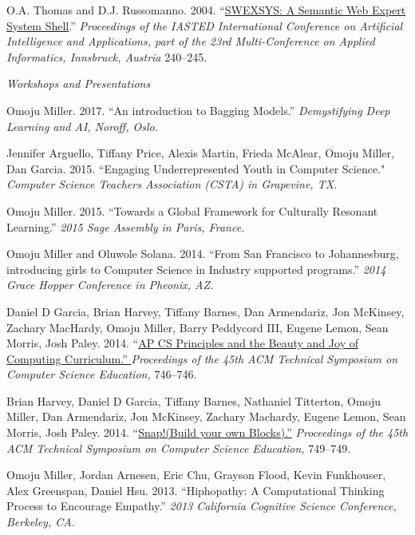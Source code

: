 \documentclass[11pt,article,oneside]{memoir}
\begin{document}
\ind O.A. Thomas and D.J. Russomanno. 2004. ``\href{http://scholar.google.com/citations?view_op=view_citation&hl=en&user=E7z_wrwAAAAJ&citation_for_view=E7z_wrwAAAAJ:2osOgNQ5qMEC}{SWEXSYS: A Semantic Web Expert System Shell}.'' \emph{Proceedings of the IASTED International Conference on Artificial Intelligence and Applications, part of the 23rd Multi-Conference on Applied Informatics, Innsbruck, Austria} 240--245.

\bigskip

\noindent\emph{Workshops and Presentations  \vspace{0.05in}}


\ind Omoju Miller. 2017. ``An introduction to Bagging Models.'' \emph{Demystifying Deep Learning and AI, Noroff, Oslo.}

\ind Jennifer Arguello, Tiffany Price, Alexis Martin, Frieda McAlear, Omoju Miller, Dan Garcia. 2015. ``Engaging Underrepresented Youth in Computer Science."  \emph{Computer Science Teachers Association (CSTA) in Grapevine, TX.}

\ind Omoju Miller. 2015. ``Towards a Global Framework for Culturally Resonant Learning.'' \emph{2015 Sage Assembly in Paris, France.}

\ind Omoju Miller and Oluwole Solana. 2014. ``From San Francisco to Johannesburg, introducing girls to Computer Science in Industry supported programs.'' \emph{2014 Grace Hopper Conference in Pheonix, AZ.}

\ind Daniel D Garcia, Brian Harvey, Tiffany Barnes, Dan Armendariz, Jon McKinsey, Zachary MacHardy, Omoju Miller, Barry Peddycord III, Eugene Lemon, Sean Morris, Josh Paley. 2014. ``\href{http://dl.acm.org/citation.cfm?id=2539026}{AP CS Principles and the Beauty and Joy of Computing Curriculum.'' }\emph{Proceedings of the 45th ACM Technical Symposium on Computer Science Education,} 746--746.

\ind Brian Harvey, Daniel D Garcia, Tiffany Barnes, Nathaniel Titterton, Omoju Miller, Dan Armendariz, Jon McKinsey, Zachary Machardy, Eugene Lemon, Sean Morris, Josh Paley. 2014. ``\href{http://dl.acm.org/citation.cfm?id=2539022}{Snap!(Build your own Blocks).''} \emph{Proceedings of the 45th ACM Technical Symposium on Computer Science Education,} 749--749.

\ind Omoju Miller, Jordan Arnesen, Eric Chu, Grayson Flood, Kevin Funkhouser, Alex Greenspan, Daniel Hsu. 2013. ``Hiphopathy: A Computational Thinking Process to Encourage Empathy.'' \emph{2013 California Cognitive Science Conference, Berkeley, CA.}
\end{document}
